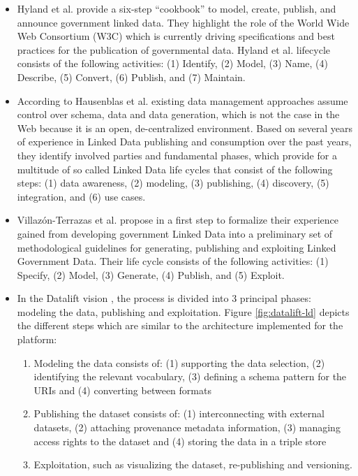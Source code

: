 \begin{itemize}
\item Hyland et al. \cite{bhyland11} provide a six-step ``cookbook'' to model, create, publish, and announce government linked data. They highlight the role of the World Wide Web Consortium (W3C) which is currently driving specifications and best practices for the publication of governmental data. Hyland et al. lifecycle consists of the following activities: (1) Identify, (2) Model, (3) Name, (4) Describe, (5) Convert, (6) Publish, and (7) Maintain.

\item According to Hausenblas et al. \cite{hausenblas12} existing data management approaches assume control over schema, data and data generation, which is not the case in the Web because it is an open, de-centralized environment. Based on several years of experience in Linked Data publishing and consumption over the past years, they identify involved parties and fundamental phases, which provide for a multitude of so called Linked Data life cycles that consist of the following steps: (1) data awareness, (2) modeling, (3) publishing, (4) discovery, (5) integration, and (6) use cases.

\item Villaz\'{o}n-Terrazas et al. propose in \cite{bvillazon} a first step to formalize their experience gained from developing government Linked Data into a preliminary set of methodological guidelines for generating, publishing and exploiting Linked Government Data. Their life cycle consists of the following activities: (1) Specify, (2) Model, (3) Generate, (4) Publish, and (5) Exploit.

\item In the Datalift vision \cite{scharffe_2012}, the process is divided into 3 principal phases: modeling the data, publishing and exploitation. Figure \ref{fig:datalift-ld} depicts the different steps which are similar to the architecture implemented for the platform:
	\begin{enumerate}
	\item Modeling the data consists of: (1) supporting the data selection, (2) identifying the relevant vocabulary, (3) defining a schema pattern for the URIs and (4) converting between formats
	
	\item Publishing the dataset consists of: (1) interconnecting with external datasets, (2) attaching provenance metadata information, (3) managing access rights to the dataset and (4) storing the data in a triple store
	
	\item  Exploitation, such as visualizing the dataset, re-publishing and versioning.
	
	\end{enumerate}
\end{itemize}

